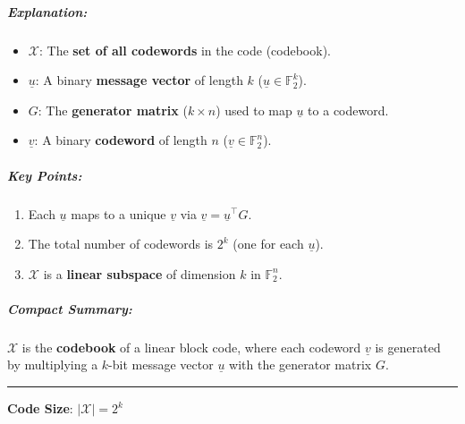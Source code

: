 \documentclass[11pt]{article}
\providecommand{\tightlist}{%
      \setlength{\itemsep}{0pt}\setlength{\parskip}{0pt}}
\begin{document}
\subparagraph{Explanation:}\label{explanation-1}

\begin{itemize}
\tightlist
\item
  \(\mathcal{X}\): The \textbf{set of all codewords} in the code
  (codebook).
\item
  \(\underline{u}\): A binary \textbf{message vector} of length \(k\)
  (\(\underline{u} \in \mathbb{F}_2^k\)).
\item
  \(G\): The \textbf{generator matrix} (\(k \times n\)) used to map
  \(\underline{u}\) to a codeword.
\item
  \(\underline{v}\): A binary \textbf{codeword} of length \(n\)
  (\(\underline{v} \in \mathbb{F}_2^n\)).
\end{itemize}

\subparagraph{Key Points:}\label{key-points}

\begin{enumerate}
\def\labelenumi{\arabic{enumi}.}
\tightlist
\item
  Each \(\underline{u}\) maps to a unique \(\underline{v}\) via
  \(\underline{v} = \underline{u}^\top G\).
\item
  The total number of codewords is \(2^k\) (one for each
  \(\underline{u}\)).
\item
  \(\mathcal{X}\) is a \textbf{linear subspace} of dimension \(k\) in
  \(\mathbb{F}_2^n\).
\end{enumerate}

\subparagraph{Compact Summary:}\label{compact-summary-1}

\(\mathcal{X}\) is the \textbf{codebook} of a linear block code, where
each codeword \(\underline{v}\) is generated by multiplying a \(k\)-bit
message vector \(\underline{u}\) with the generator matrix \(G\).

\begin{center}\rule{0.5\linewidth}{0.5pt}\end{center}

\textbf{Code Size}: \(|\mathcal{X}| = 2^k\)
\end{document}
